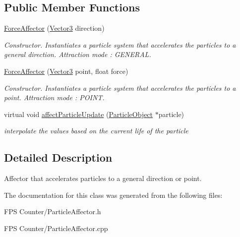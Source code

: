 \subsection*{Public Member Functions}
\begin{DoxyCompactItemize}
\item 
\mbox{\label{class_force_affector_ac644ea9e122d1c890115e0a08d9a0045}} 
\mbox{\hyperlink{class_force_affector_ac644ea9e122d1c890115e0a08d9a0045}{Force\+Affector}} (\mbox{\hyperlink{class_vector3}{Vector3}} direction)
\begin{DoxyCompactList}\small\item\em Constructor. Instantiates a particle system that accelerates the particles to a general direction. Attraction mode \+: G\+E\+N\+E\+R\+AL. \end{DoxyCompactList}\item 
\mbox{\label{class_force_affector_adb06c5df310a2f3c903170bd1cb87ea6}} 
\mbox{\hyperlink{class_force_affector_adb06c5df310a2f3c903170bd1cb87ea6}{Force\+Affector}} (\mbox{\hyperlink{class_vector3}{Vector3}} point, float force)
\begin{DoxyCompactList}\small\item\em Constructor. Instantiates a particle system that accelerates the particles to a point. Attraction mode \+: P\+O\+I\+NT. \end{DoxyCompactList}\item 
\mbox{\label{class_force_affector_a3d64d25fb67c854d24b7b714d675477a}} 
virtual void \mbox{\hyperlink{class_force_affector_a3d64d25fb67c854d24b7b714d675477a}{affect\+Particle\+Update}} (\mbox{\hyperlink{class_particle_object}{Particle\+Object}} $\ast$particle)
\begin{DoxyCompactList}\small\item\em interpolate the values based on the current life of the particle \end{DoxyCompactList}\end{DoxyCompactItemize}


\subsection{Detailed Description}
Affector that accelerates particles to a general direction or point. 

The documentation for this class was generated from the following files\+:\begin{DoxyCompactItemize}
\item 
F\+P\+S Counter/Particle\+Affector.\+h\item 
F\+P\+S Counter/Particle\+Affector.\+cpp\end{DoxyCompactItemize}
